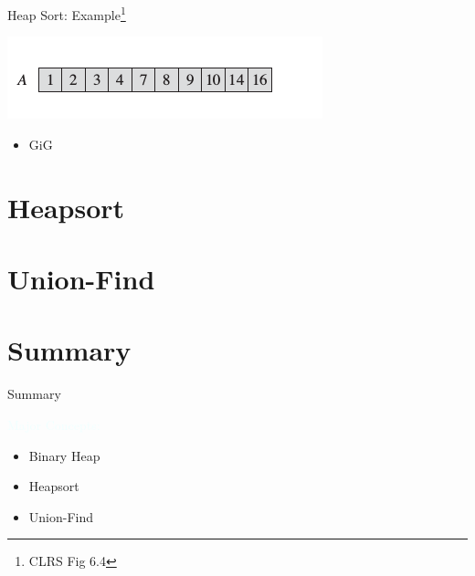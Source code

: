 \documentclass{beamer}
\newcommand{\tblue}[1]{{\Large {\textcolor{azure}{#1}}}}
\begin{document}
\begin{frame}{Heap Sort: Example\footnote{CLRS Fig 6.4}}
    \begin{center}
        \includegraphics[scale=0.5]{heapSort11.png}
    \end{center}
\end{frame}


\begin{frame}{}
    \begin{itemize}
        \item GiG
    \end{itemize}
\end{frame}


\section{Heapsort}
\section{Union-Find}
\section{Summary}

\begin{frame}{Summary}

\tblue{Major Concepts:}
\begin{itemize}
\item Binary Heap
\item Heapsort
\item Union-Find
\end{itemize}
\end{frame}
\end{document}
